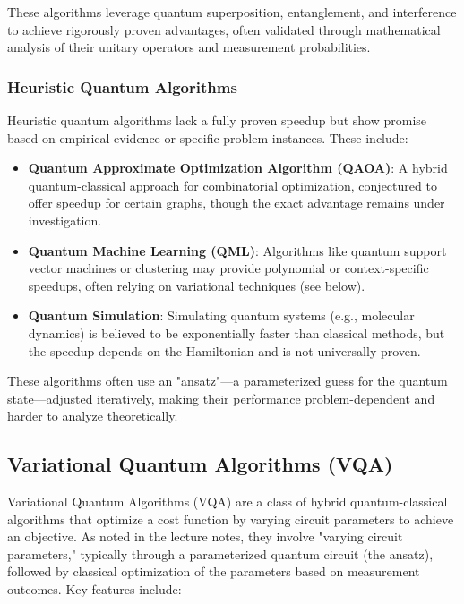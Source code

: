 These algorithms leverage quantum superposition, entanglement, and
interference to achieve rigorously proven advantages, often validated through
mathematical analysis of their unitary operators and measurement probabilities.

\subsubsection*{Heuristic Quantum Algorithms}

Heuristic quantum algorithms lack a fully proven speedup but show promise
based on empirical evidence or specific problem instances. These include:

\begin{itemize}
  \item \textbf{Quantum Approximate Optimization Algorithm (QAOA)}: A hybrid
    quantum-classical approach for combinatorial optimization, conjectured to
    offer speedup for certain graphs, though the exact advantage remains
    under investigation.

  \item \textbf{Quantum Machine Learning (QML)}: Algorithms like quantum
    support vector machines or clustering may provide polynomial or
    context-specific speedups, often relying on variational techniques (see
    below).

  \item \textbf{Quantum Simulation}: Simulating quantum systems (e.g.,
    molecular dynamics) is believed to be exponentially faster than classical
    methods, but the speedup depends on the Hamiltonian and is not
    universally proven.
\end{itemize}

These algorithms often use an "ansatz"—a parameterized guess for the quantum
state—adjusted iteratively, making their performance problem-dependent and
harder to analyze theoretically.


\subsection*{Variational Quantum Algorithms (VQA)}

Variational Quantum Algorithms (VQA) are a class of hybrid quantum-classical
algorithms that optimize a cost function by varying circuit parameters to
achieve an objective. As noted in the lecture notes, they involve "varying
circuit parameters," typically through a parameterized quantum circuit (the
ansatz), followed by classical optimization of the parameters based on
measurement outcomes. Key features include:

